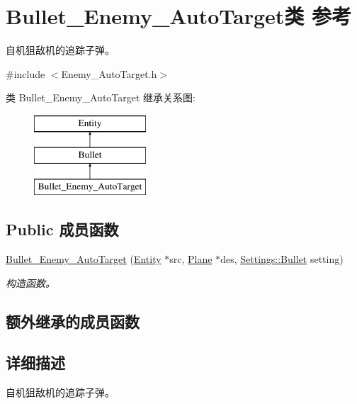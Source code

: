 \hypertarget{class_bullet___enemy___auto_target}{}\section{Bullet\+\_\+\+Enemy\+\_\+\+Auto\+Target类 参考}
\label{class_bullet___enemy___auto_target}


自机狙敌机的追踪子弹。  




{\ttfamily \#include $<$Enemy\+\_\+\+Auto\+Target.\+h$>$}

类 Bullet\+\_\+\+Enemy\+\_\+\+Auto\+Target 继承关系图\+:\begin{figure}[H]
\begin{center}
\leavevmode
\includegraphics[height=3.000000cm]{class_bullet___enemy___auto_target}
\end{center}
\end{figure}
\subsection*{Public 成员函数}
\begin{DoxyCompactItemize}
\item 
\hyperlink{class_bullet___enemy___auto_target_ad2d9d9d8016dff0e1fd6f11c8800f314}{Bullet\+\_\+\+Enemy\+\_\+\+Auto\+Target} (\hyperlink{class_entity}{Entity} $\ast$src, \hyperlink{class_plane}{Plane} $\ast$des, \hyperlink{struct_settings_1_1_bullet}{Settings\+::\+Bullet} setting)
\begin{DoxyCompactList}\small\item\em 构造函数。 \end{DoxyCompactList}\end{DoxyCompactItemize}
\subsection*{额外继承的成员函数}


\subsection{详细描述}
自机狙敌机的追踪子弹。 

